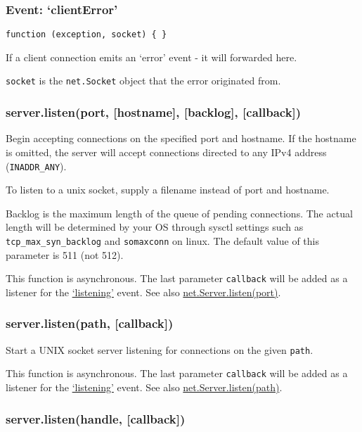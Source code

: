 \subsubsection{Event: `clientError'}

\texttt{function (exception, socket) \{ \}}

If a client connection emits an `error' event - it will forwarded here.

\texttt{socket} is the \texttt{net.Socket} object that the error
originated from.

\subsubsection{server.listen(port, {[}hostname{]}, {[}backlog{]},
{[}callback{]})}

Begin accepting connections on the specified port and hostname. If the
hostname is omitted, the server will accept connections directed to any
IPv4 address (\texttt{INADDR\_ANY}).

To listen to a unix socket, supply a filename instead of port and
hostname.

Backlog is the maximum length of the queue of pending connections. The
actual length will be determined by your OS through sysctl settings such
as \texttt{tcp\_max\_syn\_backlog} and \texttt{somaxconn} on linux. The
default value of this parameter is 511 (not 512).

This function is asynchronous. The last parameter \texttt{callback} will
be added as a listener for the
\href{net.html\#net\_event\_listening}{`listening'} event. See also
\href{net.html\#net\_server\_listen\_port\_host\_backlog\_callback}{net.Server.listen(port)}.

\subsubsection{server.listen(path, {[}callback{]})}

Start a UNIX socket server listening for connections on the given
\texttt{path}.

This function is asynchronous. The last parameter \texttt{callback} will
be added as a listener for the
\href{net.html\#net\_event\_listening}{`listening'} event. See also
\href{net.html\#net\_server\_listen\_path\_callback}{net.Server.listen(path)}.

\subsubsection{server.listen(handle, {[}callback{]})}

